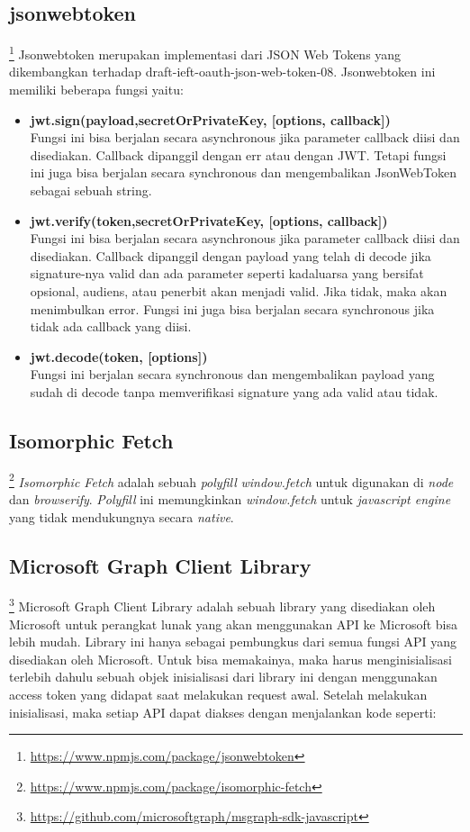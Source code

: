 \subsection{jsonwebtoken}\footnote{\url{https://www.npmjs.com/package/jsonwebtoken}}
Jsonwebtoken merupakan implementasi dari JSON Web Tokens yang dikembangkan terhadap draft-ieft-oauth-json-web-token-08. Jsonwebtoken ini memiliki beberapa fungsi yaitu:
\begin{itemize}
    \item \textbf{jwt.sign(payload,secretOrPrivateKey, [options, callback])}\\
    Fungsi ini bisa berjalan secara asynchronous jika parameter callback diisi dan disediakan. Callback dipanggil dengan err atau dengan JWT. Tetapi fungsi ini juga bisa berjalan secara synchronous dan mengembalikan JsonWebToken sebagai sebuah string. 
    \item \textbf{jwt.verify(token,secretOrPrivateKey, [options, callback])}\\
    Fungsi ini bisa berjalan secara asynchronous jika parameter callback diisi dan disediakan. Callback dipanggil dengan payload yang telah di decode jika signature-nya valid dan ada parameter seperti kadaluarsa yang bersifat opsional, audiens, atau penerbit akan menjadi valid. Jika tidak, maka akan menimbulkan error. Fungsi ini juga bisa berjalan secara synchronous jika tidak ada callback yang diisi. 
    \item \textbf{jwt.decode(token, [options])}\\
    Fungsi ini berjalan secara synchronous dan mengembalikan payload yang sudah di decode tanpa memverifikasi signature yang ada valid atau tidak. 
\end{itemize}

\subsection{Isomorphic Fetch}\footnote{\url{https://www.npmjs.com/package/isomorphic-fetch}}
\textit{Isomorphic Fetch} adalah sebuah \textit{polyfill} \textit{window.fetch} untuk digunakan di \textit{node} dan \textit{browserify}. \textit{Polyfill} ini memungkinkan \textit{window.fetch} untuk \textit{javascript engine} yang tidak mendukungnya secara \textit{native}. 

\subsection{Microsoft Graph Client Library}\footnote{\url{https://github.com/microsoftgraph/msgraph-sdk-javascript}}
Microsoft Graph Client Library adalah sebuah library yang disediakan oleh Microsoft untuk perangkat lunak yang akan menggunakan API ke Microsoft bisa lebih mudah. Library ini hanya sebagai pembungkus dari semua fungsi API yang disediakan oleh Microsoft. Untuk bisa memakainya, maka harus menginisialisasi terlebih dahulu sebuah objek inisialisasi dari library ini dengan menggunakan access token yang didapat saat melakukan request awal. Setelah melakukan inisialisasi, maka setiap API dapat diakses dengan menjalankan kode seperti:

